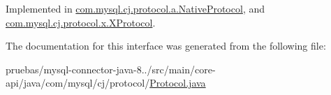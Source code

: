 Implemented in \mbox{\hyperlink{classcom_1_1mysql_1_1cj_1_1protocol_1_1a_1_1_native_protocol_a75978c3d6814145dfb5d0465d3185bd0}{com.\+mysql.\+cj.\+protocol.\+a.\+Native\+Protocol}}, and \mbox{\hyperlink{classcom_1_1mysql_1_1cj_1_1protocol_1_1x_1_1_x_protocol_a8895e989b506fa14b82358935c6b34f2}{com.\+mysql.\+cj.\+protocol.\+x.\+X\+Protocol}}.



The documentation for this interface was generated from the following file\+:\begin{DoxyCompactItemize}
\item 
pruebas/mysql-\/connector-\/java-\/8../src/main/core-\/api/java/com/mysql/cj/protocol/\mbox{\hyperlink{_protocol_8java}{Protocol.\+java}}\end{DoxyCompactItemize}
